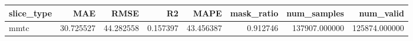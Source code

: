 \begin{tabular}{lrrrrrrr}
\toprule
slice_type & MAE & RMSE & R2 & MAPE & mask_ratio & num_samples & num_valid \\
\midrule
mmtc & 30.725527 & 44.282558 & 0.157397 & 43.456387 & 0.912746 & 137907.000000 & 125874.000000 \\
\bottomrule
\end{tabular}
